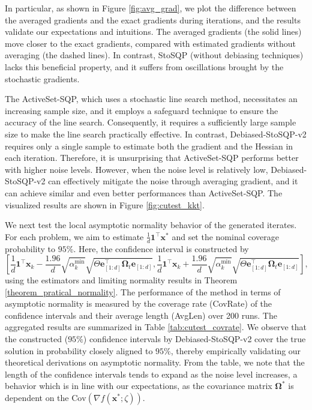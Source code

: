 \documentclass[aos]{imsart}
\numberwithin{equation}{section}
\theoremstyle{plain}
\newcommand{\michael}[1]{\textcolor{red}{Michael:\ #1}}
\begin{document}
In particular, as shown in Figure \ref{fig:avg_grad}, we plot the difference between the averaged gradients and the exact gradients during iterations, and the results validate our expectations and intuitions. The averaged gradients (the solid lines) move closer to the exact gradients, compared with estimated gradients without averaging (the dashed lines).
In contrast, StoSQP (without debiasing techniques) lacks this beneficial property, and it suffers from oscillations brought by the stochastic gradients. 

The ActiveSet-SQP, which uses a stochastic line search method, necessitates an increasing sample size, and it employs a safeguard technique to ensure the accuracy of the line search. 
Consequently, it requires a sufficiently large sample size to make the line search practically effective. 
In contrast, Debiased-StoSQP-v2 requires only a single sample to estimate both the gradient and the Hessian in each iteration.
Therefore, it is unsurprising that ActiveSet-SQP performs better with higher noise levels. 
However, when the noise level is relatively low, Debiased-StoSQP-v2 can effectively mitigate the noise through averaging gradient, and it can achieve similar and even better performances than ActiveSet-SQP. 
The visualized results are shown in Figure \ref{fig:cutest_kkt}.


We next test the local asymptotic normality behavior of the generated iterates. For each problem, we aim to estimate $\frac{1}{d}\bm{1}^{\top} \bm{x}^{*}$ and set the nominal coverage probability to $95\%$. Here, the confidence interval is constructed by $$\left[\frac{1}{d}\bm{1}^{\top} \bm{x}_{k} - \frac{1.96}{d}\sqrt{\alpha_k^{\min}}  \sqrt{\Theta \bm{e}_{[1:d]} ^{\top} \bm{\Omega}_{t} \bm{e}_{[1:d]} }, \frac{1}{d}\bm{1}^{\top} \bm{x}_{k} + \frac{1.96}{d}\sqrt{ \alpha_k^{\min}}  \sqrt{\Theta \bm{e}_{[1:d]}^{\top} \bm{\Omega}_{t} \bm{e}_{[1:d]} } \right],$$
using the estimators and limiting normality results in Theorem \ref{theorem_pratical_normality}. The performance of the method in terms of asymptotic normality is measured by the coverage rate (CovRate) of the confidence intervals and their average length (AvgLen) over 200 runs. 
The aggregated results are summarized in Table \ref{tab:cutest_covrate}. We observe that the constructed ($95\%$) confidence intervals by Debiased-StoSQP-v2 cover the true solution in probability closely aligned to $95\%$, thereby empirically validating our theoretical derivations on asymptotic normality. 
From the table, we note that the length of the confidence intervals tends to expand as the noise level increases, a behavior which is in line with our expectations, as the covariance matrix $\bm{\Omega}^{*}$ is dependent on the $\text{Cov}\left( \nabla f(\bm{x}^{*};\zeta)\right)$. 
\end{document}
